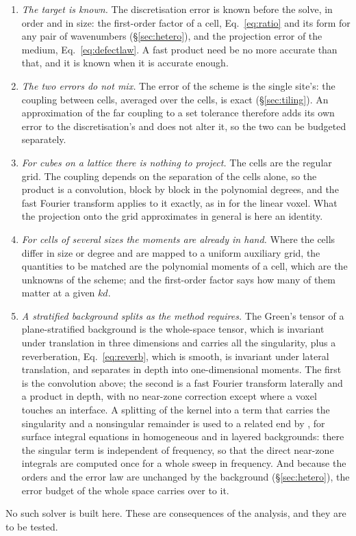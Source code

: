 \documentclass[11pt,a4paper]{article}
\begin{document}
\begin{enumerate}
\item \emph{The target is known.} The discretisation error is known before the solve, in order and in
size: the first-order factor of a cell, Eq.~\eqref{eq:ratio} and its form for any pair of wavenumbers
(\S\ref{sec:hetero}), and the projection error of the medium, Eq.~\eqref{eq:defectlaw}. A fast product
need be no more accurate than that, and it is known when it is accurate enough.
\item \emph{The two errors do not mix.} The error of the scheme is the single site's: the coupling
between cells, averaged over the cells, is exact (\S\ref{sec:tiling}). An approximation of the far
coupling to a set tolerance therefore adds its own error to the discretisation's and does not alter
it, so the two can be budgeted separately.
\item \emph{For cubes on a lattice there is nothing to project.} The cells are the regular grid. The
coupling depends on the separation of the cells alone, so the product is a convolution, block by block
in the polynomial degrees, and the fast Fourier transform applies to it exactly, as in
\citet{Georgakis2020} for the linear voxel. What the projection onto the grid approximates in general is here an identity.
\item \emph{For cells of several sizes the moments are already in hand.} Where the cells differ in
size or degree and are mapped to a uniform auxiliary grid, the quantities to be matched are the
polynomial moments of a cell, which are the unknowns of the scheme; and the first-order factor says
how many of them matter at a given $kd$.
\item \emph{A stratified background splits as the method requires.} The Green's tensor of a
plane-stratified background is the whole-space tensor, which is invariant under translation in three
dimensions and carries all the singularity, plus a reverberation, Eq.~\eqref{eq:reverb}, which is
smooth, is invariant under lateral translation, and separates in depth into one-dimensional moments.
The first is the convolution above; the second is a fast Fourier transform laterally and a product in
depth, with no near-zone correction except where a voxel touches an interface. A splitting of the kernel into a term that carries the singularity and a nonsingular
remainder is used to a related end by \citet{Sharma2021}, for surface integral equations in homogeneous
and in layered backgrounds: there the singular term is independent of frequency, so that the direct
near-zone integrals are computed once for a whole sweep in frequency. And because the orders and the error law are unchanged by the background
(\S\ref{sec:hetero}), the error budget of the whole space carries over to it.
\end{enumerate}
No such solver is built here. These are consequences of the analysis, and they are to be tested.
\end{document}
